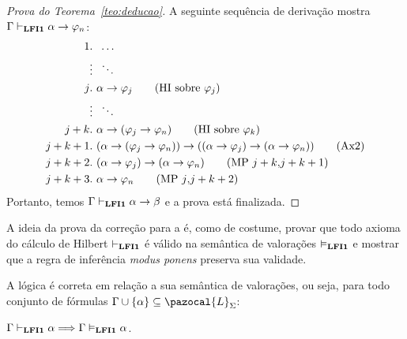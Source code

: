 \begin{proof}[Prova do Teorema~\ref{teo:deducao}]
         A seguinte sequência de derivação mostra $\Gamma \vdash_{\textbf{LFI1}{}} \alpha \to \varphi_{n}$:
         \begin{align*}
             \text{1}&.~ \; \ldots\\
             &\vdots \; ~\ddots\\
             \text{$j$}&.~ \alpha \to \phi_{j} \tag{HI sobre $\phi_{j}$}\\
             &\vdots \; ~\ddots\\
             \text{$j + k$}&.~ \alpha \to (\phi_{j} \to \phi_{n}) \tag{HI sobre $\phi_{k}$}\\
             \text{$j + k + 1$}&.~ (\alpha \to (\phi_{j} \to \phi_{n})) \to ((\alpha \to \phi_{j}) \to (\alpha \to \phi_{n})) \tag{Ax2}\\
             \text{$j + k + 2$}&.~ (\alpha \to \phi_{j}) \to (\alpha \to \phi_{n}) \tag{MP $j + k$\text{,}$j + k + 1$}\\
              \text{$j + k + 3$}&.~ \alpha \to \phi_{n} \tag{MP $j$\text{,}$j + k + 2$}
         \end{align*}
         Portanto, temos $\Gamma \vdash_{\textbf{LFI1}{}} \alpha \to \beta$ e a prova está finalizada.
         
    \end{proof}

    A ideia da prova da correção para a \lfium{} é, como de costume, provar que todo axioma do cálculo de Hilbert $\vdash_{\textbf{LFI1}{}}$ é válido na semântica de valorações $\vDash_{\textbf{LFI1}{}}$ e mostrar que a regra de inferência \textit{modus ponens} preserva sua validade.

    \begin{teorema}[Correção]\label{teo:correcao}
        A lógica {\normalfont\lfium{}} é correta em relação a sua semântica de valorações, ou seja, para todo conjunto de fórmulas $\Gamma \cup \{\alpha\} \subseteq \pazocal{L}_{\Sigma}$:

        \centering
        {\normalfont{} $\Gamma \vdash_{\textbf{LFI1}{}} \alpha \Longrightarrow \Gamma \vDash_{\textbf{LFI1}{}} \alpha$.}
    \end{teorema}

